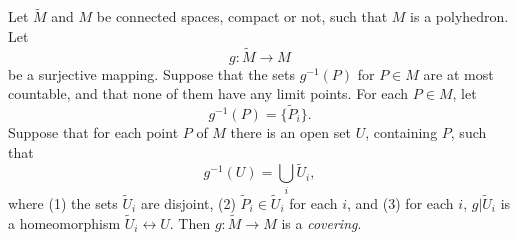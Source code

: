 Let $\tilde{M}$ and $M$ be connected spaces, compact or not, such that $M$ is a polyhedron. Let
$$g: \tilde{M} \rightarrow M$$
be a surjective mapping. Suppose that the sets $g^{-1}(P)$ for $P \in M$ are at most countable, and that none of them have any limit points. For each $P \in M$, let
$$g^{-1}(P) = \{ \tilde{P}_i \}.$$
Suppose that for each point $P$ of $M$ there is an open set $U$, containing $P$, such that
$$g^{-1}(U) = \bigcup_i \tilde{U}_i,$$
where (1) the sets $\tilde{U}_i$ are disjoint, (2) $\tilde{P}_i \in \tilde{U}_i$ for each $i$, and (3) for each $i$, $g|\tilde{U}_i$ is a homeomorphism $\tilde{U}_i \leftrightarrow U$. Then $g: \tilde{M} \rightarrow M$ is a \emph{covering}.
